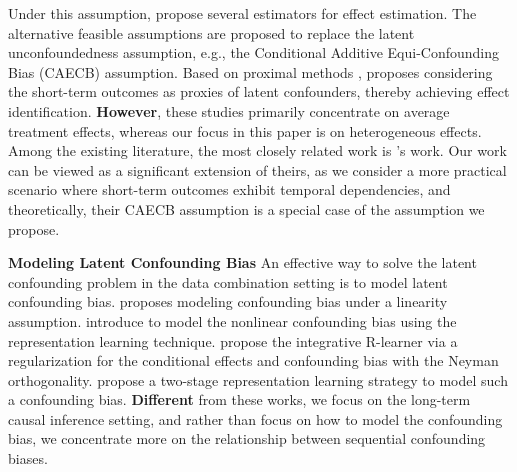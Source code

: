 Under this assumption, \citet{yang2024estimating, chen2023semiparametric} propose several estimators for effect estimation.
The alternative feasible assumptions \cite{ghassami2022combining} are proposed to replace the latent unconfoundedness assumption, e.g., the Conditional Additive Equi-Confounding Bias (CAECB) assumption.
Based on proximal methods \cite{tchetgen2024introduction}, \citet{imbens2022long} proposes considering the short-term outcomes as proxies of latent confounders, thereby achieving effect identification.
\textbf{However}, these studies primarily concentrate on average treatment effects, whereas our focus in this paper is on heterogeneous effects.
Among the existing literature, the most closely related work is \citet{ghassami2022combining}'s work.
Our work can be viewed as a significant extension of theirs, as we consider a more practical scenario where short-term outcomes exhibit temporal dependencies, and theoretically, their CAECB assumption is a special case of the assumption we propose.


\textbf{Modeling Latent Confounding Bias}
An effective way to solve the latent confounding problem in the data combination setting is to model latent confounding bias.
\citet{kallus2018removing} proposes modeling confounding bias under a linearity assumption.
\citet{hatt2022combining} introduce to model the nonlinear confounding bias using the representation learning technique.
\citet{wu2022integrative} propose the integrative R-learner via a regularization for the conditional effects and confounding bias with the Neyman orthogonality.
\citet{zhou2025two} propose a two-stage representation learning strategy to model such a confounding bias.
\textbf{Different} from these works, we focus on the long-term causal inference setting, and rather than focus on how to model the confounding bias, we concentrate more on the relationship between sequential confounding biases.
